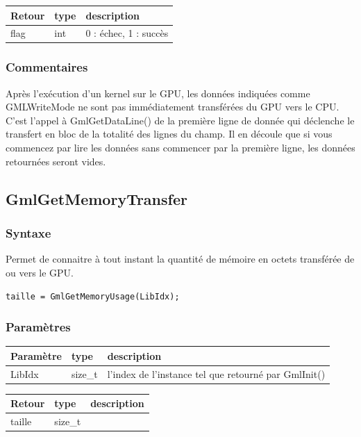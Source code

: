 \documentclass[a4paper,12pt]{article}
\begin{document}
\medskip

\begin{tabular}{|m{2cm}|m{1.5cm}|m{10.5cm}|}
\hline
Retour     & type   & description \\
\hline
flag       & int    & 0 : échec, 1 : succès \\
\hline
\end{tabular}

\subsubsection*{Commentaires}
Après l'exécution d'un kernel sur le GPU, les données indiquées comme GMLWriteMode ne sont pas immédiatement transférées du GPU vers le CPU.
C'est l'appel à GmlGetDataLine() de la première ligne de donnée qui déclenche le transfert en bloc de la totalité des lignes du champ.
Il en découle que si vous commencez par lire les données sans commencer par la première ligne, les données retournées seront vides.


\subsection{GmlGetMemoryTransfer}

\subsubsection*{Syntaxe}

Permet de connaitre à tout instant la quantité de mémoire en octets transférée de ou vers le GPU.

{\tt taille = GmlGetMemoryUsage(LibIdx);}

\subsubsection*{Paramètres}

\begin{tabular}{|m{2cm}|m{1.5cm}|m{10.5cm}|}
\hline
Paramètre  & type    & description \\
\hline
LibIdx     & size\_t & l'index de l'instance tel que retourné par GmlInit() \\
\hline
\end{tabular}

\medskip

\begin{tabular}{|m{2cm}|m{1.5cm}|m{10.5cm}|}
\hline
Retour     & type    & description \\
\hline
taille     & size\_t & \\
\hline
\end{tabular}
\end{document}
